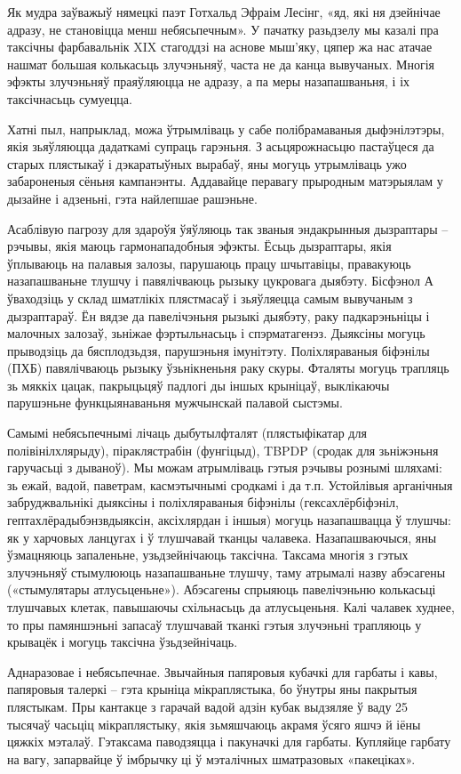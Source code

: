 Як мудра заўважыў нямецкі паэт Готхальд Эфраім Лесінг, «яд, які ня дзейнічае адразу, не становіцца менш небясьпечным». У пачатку разьдзелу мы казалі пра таксічны фарбавальнік XIX стагоддзі на аснове мыш'яку, цяпер жа нас атачае нашмат большая колькасьць злучэньняў, часта не да канца вывучаных. Многія эфэкты злучэньняў праяўляюцца не адразу, а па меры назапашваньня, і іх таксічнасьць сумуецца.

Хатні пыл, напрыклад, можа ўтрымліваць у сабе полібрамаваныя дыфэнілэтэры, якія зьяўляюцца дадаткамі супраць гарэньня. З асьцярожнасьцю пастаўцеся да старых плястыкаў і дэкаратыўных вырабаў, яны могуць утрымліваць ужо забароненыя сёньня кампанэнты. Аддавайце перавагу прыродным матэрыялам у дызайне і адзеньні, гэта найлепшае рашэньне.

Асаблівую пагрозу для здароўя ўяўляюць так званыя эндакрынныя дызраптары – рэчывы, якія маюць гармонападобныя эфэкты. Ёсьць дызраптары, якія ўплываюць на палавыя залозы, парушаюць працу шчытавіцы, правакуюць назапашваньне тлушчу і павялічваюць рызыку цукровага дыябэту. Бісфэнол А ўваходзіць у склад шматлікіх плястмасаў і зьяўляецца самым вывучаным з дызраптараў. Ён вядзе да павелічэньня рызыкі дыябэту, раку падкарэньніцы і малочных залозаў, зьніжае фэртыльнасьць і спэрматагенэз. Дыяксіны могуць прыводзіць да бясплодзьдзя, парушэньня імунітэту. Поліхляраваныя біфэнілы (ПХБ) павялічваюць рызыку ўзьнікненьня раку скуры. Фталяты могуць трапляць зь мяккіх цацак, пакрыцьцяў падлогі ды іншых крыніцаў, выклікаючы парушэньне функцыянаваньня мужчынскай палавой сыстэмы.

Самымі небясьпечнымі лічаць дыбутылфталят (плястыфікатар для полівінілхлярыду), піраклястрабін (фунгіцыд), TBPDP (сродак для зьніжэньня гаручасьці з дываноў). Мы можам атрымліваць гэтыя рэчывы рознымі шляхамі: зь ежай, вадой, паветрам, касмэтычнымі сродкамі і да т.п. Устойлівыя арганічныя забруджвальнікі дыяксіны і поліхляраваныя біфэнілы (гексахлёрбіфэніл, гептахлёрадыбэнзвдыяксін, аксіхлярдан і іншыя) могуць назапашвацца ў тлушчы: як у харчовых ланцугах і ў тлушчавай тканцы чалавека. Назапашваючыся, яны ўзмацняюць запаленьне, узьдзейнічаюць таксічна. Таксама многія з гэтых злучэньняў стымулююць назапашваньне тлушчу, таму атрымалі назву абэсагены («стымулятары атлусьценьне»). Абэсагены спрыяюць павелічэньню колькасьці тлушчавых клетак, павышаючы схільнасьць да атлусьценьня. Калі чалавек худнее, то пры памяншэньні запасаў тлушчавай тканкі гэтыя злучэньні трапляюць у крывацёк і могуць таксічна ўзьдзейнічаць.

Аднаразовае і небясьпечнае. Звычайныя папяровыя кубачкі для гарбаты і кавы, папяровыя талеркі – гэта крыніца мікраплястыка, бо ўнутры яны пакрытыя плястыкам. Пры кантакце з гарачай вадой адзін кубак выдзяляе ў ваду 25 тысячаў часьціц мікраплястыку, якія зьмяшчаюць акрамя ўсяго яшчэ й іёны цяжкіх мэталаў. Гэтаксама паводзяцца і пакуначкі для гарбаты. Купляйце гарбату на вагу, запарвайце ў імбрычку ці ў мэталічных шматразовых «пакеціках».

